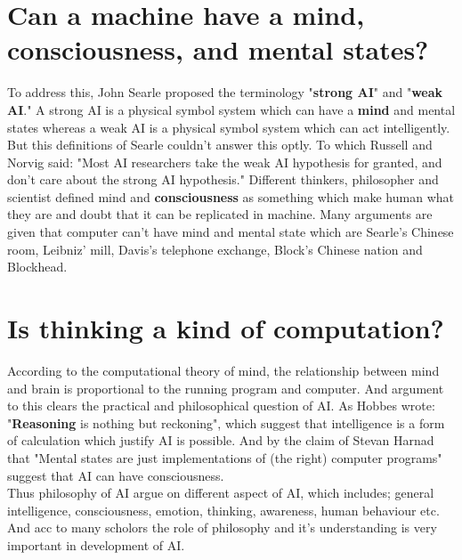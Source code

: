 \documentclass{article}
\begin{document}
\section{Can a machine have a mind, consciousness, and mental states?}
To address this, John Searle proposed the terminology "\textbf{strong AI}" and "\textbf{weak AI}." A strong AI is a physical symbol system which can have a \textbf{mind} and mental states whereas a weak AI is a physical symbol system which can act intelligently. But this definitions of Searle couldn't answer this optly. To which Russell and Norvig said: "Most AI researchers take the weak AI hypothesis for granted, and don't care about the strong AI hypothesis."
Different thinkers, philosopher and scientist defined mind and \textbf{consciousness} as something which make human what they are and doubt that it can be replicated in machine. Many arguments are given that computer can't have mind and mental state which are Searle's Chinese room, Leibniz' mill, Davis's telephone exchange, Block's Chinese nation and Blockhead.

\section{Is thinking a kind of computation?}
According to the computational theory of mind, the relationship between mind and brain is proportional to the running program and computer. And argument to this clears the practical and philosophical question of AI. As Hobbes wrote: "\textbf{Reasoning} is nothing but reckoning", which suggest that intelligence is a form of calculation which justify AI is possible. And by the claim of Stevan Harnad that "Mental states are just implementations of (the right) computer programs" suggest that AI can have consciousness.
\\

Thus philosophy of AI argue on different aspect of AI, which includes; general intelligence, consciousness, emotion, thinking, awareness, human behaviour etc. And acc to many scholors the role of philosophy and it's understanding is very important in development of AI.
\end{document}
